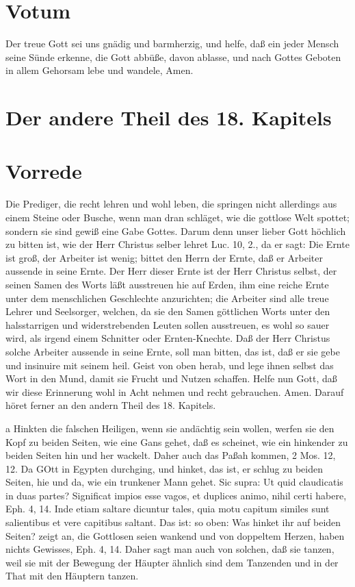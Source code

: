 \section{Votum}

Der treue Gott sei uns gnädig und barmherzig, und helfe, daß ein jeder Mensch seine Sünde erkenne, die Gott abbüße, davon ablasse, und nach Gottes Geboten in allem Gehorsam lebe und wandele, Amen.

\section{Der andere Theil des 18. Kapitels}

\section{Vorrede}

Die Prediger, die recht lehren und wohl leben, die springen nicht allerdings aus einem Steine oder Busche, wenn man dran schläget, wie die gottlose Welt spottet; sondern sie sind gewiß eine Gabe Gottes. Darum denn unser lieber Gott höchlich zu bitten ist, wie der Herr Christus selber lehret Luc. 10, 2., da er sagt: Die Ernte ist groß, der Arbeiter ist wenig; bittet den Herrn der Ernte, daß er Arbeiter aussende in seine Ernte. Der Herr dieser Ernte ist der Herr Christus selbst, der seinen Samen des Worts läßt ausstreuen hie auf Erden, ihm eine reiche Ernte unter dem menschlichen Geschlechte anzurichten; die Arbeiter sind alle treue Lehrer und Seelsorger, welchen, da sie den Samen göttlichen Worts unter den halsstarrigen und widerstrebenden Leuten sollen ausstreuen, es wohl so sauer wird, als irgend einem Schnitter oder Ernten-Knechte. Daß der Herr Christus solche Arbeiter aussende in seine Ernte, soll man bitten, das ist, daß er sie gebe und insinuire mit seinem heil. Geist von oben herab, und lege ihnen selbst das Wort in den Mund, damit sie Frucht und Nutzen schaffen. Helfe nun Gott, daß wir diese Erinnerung wohl in Acht nehmen und recht gebrauchen. Amen. Darauf höret ferner an den andern Theil des 18. Kapitels.

a Hinkten die falschen Heiligen, wenn sie andächtig sein wollen, werfen sie den Kopf zu beiden Seiten, wie eine Gans gehet, daß es scheinet, wie ein hinkender zu beiden Seiten hin und her wackelt. Daher auch das Paßah kommen, 2 Mos. 12, 12. Da GOtt in Egypten durchging, und hinket, das ist, er schlug zu beiden Seiten, hie und da, wie ein trunkener Mann gehet. Sic supra: Ut quid claudicatis in duas partes? Significat impios esse vagos, et duplices animo, nihil certi habere, Eph. 4, 14. Inde etiam saltare dicuntur tales, quia motu capitum similes sunt salientibus et vere capitibus saltant. Das ist: so oben: Was hinket ihr auf beiden Seiten? zeigt an, die Gottlosen seien wankend und von doppeltem Herzen, haben nichts Gewisses, Eph. 4, 14. Daher sagt man auch von solchen, daß sie tanzen, weil sie mit der Bewegung der Häupter ähnlich sind dem Tanzenden und in der That mit den Häuptern tanzen.

